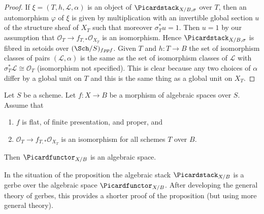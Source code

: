 \begin{proof}
If $\xi = (T, h, \mathcal{L}, \alpha)$
is an object of $\Picardstack_{X/B, \sigma}$
over $T$, then an automorphism $\varphi$ of
$\xi$ is given by multiplication with an invertible global section $u$
of the structure sheaf of $X_T$ such that moreover $\sigma_T^*u = 1$.
Then $u = 1$ by our assumption that
$\mathcal{O}_T \to f_{T, *}\mathcal{O}_{X_T}$ is an isomorphism.
Hence $\Picardstack_{X/B, \sigma}$
is fibred in setoids over $(\Sch/S)_{fppf}$.
Given $T$ and $h : T \to B$
the set of isomorphism classes of pairs $(\mathcal{L}, \alpha)$
is the same as the set of isomorphism classes of $\mathcal{L}$
with $\sigma_T^*\mathcal{L} \cong \mathcal{O}_T$ (isomorphism
not specified). This is clear because any two choices
of $\alpha$ differ by a global unit on $T$ and this is the
same thing as a global unit on $X_T$.
\end{proof}

\begin{proposition}
\label{proposition-pic-functor}
Let $S$ be a scheme. Let $f : X \to B$ be a morphism of algebraic
spaces over $S$. Assume that
\begin{enumerate}
\item $f$ is flat, of finite presentation, and proper, and
\item $\mathcal{O}_T \to f_{T, *}\mathcal{O}_{X_T}$ is an isomorphism
for all schemes $T$ over $B$.
\end{enumerate}
Then $\Picardfunctor_{X/B}$ is an algebraic space.
\end{proposition}

\noindent
In the situation of the proposition the algebraic stack
$\Picardstack_{X/B}$ is a gerbe over the algebraic space
$\Picardfunctor_{X/B}$. After developing the general
theory of gerbes, this provides a shorter proof of
the proposition (but using more general theory).

